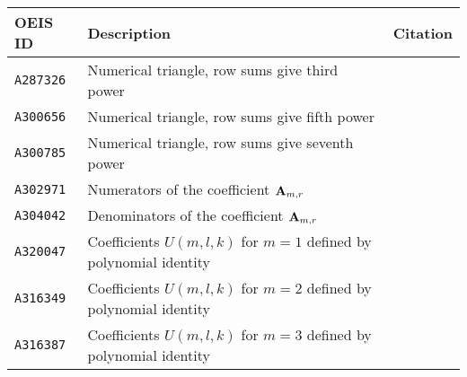 ﻿\begin{center}
    \renewcommand{\arraystretch}{1.3}
    \begin{tabular}{lll}
        \toprule
        \textbf{OEIS ID} & \textbf{Description}                                                 & \textbf{Citation}                                                  \\
        \midrule
        \texttt{A287326} & Numerical triangle, row sums give third power                        & ~\cite{oeis_numerical_triangle_row_sums_give_cubes}                \\
        \texttt{A300656} & Numerical triangle, row sums give fifth power                        & ~\cite{oeis_numerical_triangle_row_sums_give_fifth_powers}         \\
        \texttt{A300785} & Numerical triangle, row sums give seventh power                      & ~\cite{oeis_numerical_triangle_row_sums_give_seventh_powers}       \\
        \texttt{A302971} & Numerators of the coefficient ${\mathbf{A}} \sb{m,r}$                        & ~\cite{oeis_numerators_of_the_coefficient_a_m_r}                   \\
        \texttt{A304042} & Denominators of the coefficient ${\mathbf{A}} \sb{m,r}$                      & ~\cite{oeis_denominators_of_the_coefficient_a_m_r}                 \\
        \texttt{A320047} & Coefficients $U(m, l, k)$ for $m = 1$ defined by polynomial identity & ~\cite{oeis_coefficients_u_m_l_k_defined_by_polynomial_identity_1} \\
        \texttt{A316349} & Coefficients $U(m, l, k)$ for $m = 2$ defined by polynomial identity & ~\cite{oeis_coefficients_u_m_l_k_defined_by_polynomial_identity_2} \\
        \texttt{A316387} & Coefficients $U(m, l, k)$ for $m = 3$ defined by polynomial identity & ~\cite{oeis_coefficients_u_m_l_k_defined_by_polynomial_identity_3} \\
        \bottomrule
    \end{tabular}
\end{center}
